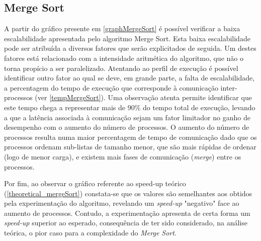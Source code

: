 \documentclass{article}
\begin{document}
\subsection{Merge Sort}
A partir do gráfico presente em \ref{graphMergeSort} é possível verificar a baixa escalabilidade apresentada pelo 
algoritmo Merge Sort. Esta baixa escalabilidade pode ser atribuída a diversos fatores que serão explicitados de seguida. 
Um destes fatores está relacionado com a intensidade aritmética do algoritmo, que não o torna propício a ser paralelizado.
Atentando ao perfil de execução é possível identificar outro fator ao qual se deve, em grande parte, a falta de 
escalabilidade, a percentagem do tempo de execução que corresponde à comunicação inter-processos (ver \ref{tempMergeSort}). 
Uma observação atenta permite identificar que este tempo chega a representar mais de 90\% do tempo total de execução, levando a que
a latência associada à comunicação sejam um fator limitador no ganho de desempenho com o aumento do número de processos.
O aumento do número de processos resulta numa maior percentagem de tempo de comunicação dado que os processos ordenam
sub-listas de tamanho menor, que são mais rápidas de ordenar (logo de menor carga), e existem mais fases de comunicação
(\textit{merge}) entre os processos.

Por fim, ao observar o gráfico referente ao speed-up teórico (\ref{theoretical_mergeSort}) constata-se que os valores 
são semelhantes aos obtidos pela experimentação do algoritmo, revelando um \textit{speed-up} "negativo" face ao aumento 
de processos. Contudo, a experimentação apresenta de certa forma um \textit{speed-up} superior ao esperado, consequência 
de ter sido considerado, na análise teórica, o pior caso para a complexidade do \textit{Merge Sort}.
\end{document}
